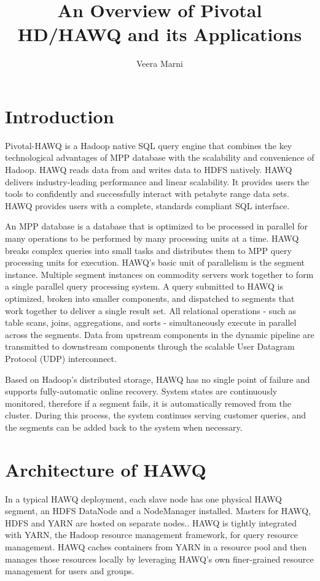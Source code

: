 \documentclass[9pt,twocolumn,twoside]{../../styles/osajnl}
\title{An Overview of Pivotal HD/HAWQ and its Applications}
\author[1]{Veera Marni}
\affil[1]{School of Informatics and Computing, Bloomington, IN 47408, 
U.S.A.}
\affil[*]{Corresponding authors: vmarni@umail.iu.edu}
\begin{document}
\maketitle

\section{Introduction} 

{Pivotal-HAWQ}\cite{www-about-hawq} is a Hadoop native SQL query 
engine that 
combines the key technological advantages of MPP database with the 
scalability and convenience of Hadoop. HAWQ reads data from and 
writes data to HDFS natively. HAWQ delivers industry-leading 
performance and linear scalability. It provides users the tools to 
confidently and successfully interact with petabyte range data sets. 
HAWQ provides users with a complete, standards compliant SQL 
interface.

{An MPP database is a database that is optimized to be processed in 
parallel for many operations to	be performed by many processing units 
at a time.}\cite{www-about-mpp} HAWQ breaks complex queries into 
small tasks and distributes them to MPP query processing units for 
execution. HAWQ’s basic unit of parallelism is the segment instance. 
Multiple segment instances on commodity servers work together to form 
a single parallel query processing system. A query submitted to HAWQ 
is optimized, broken into smaller components, and dispatched to 
segments that work together to deliver a single result set. All 
relational operations - such as table scans, joins, aggregations, and 
sorts - simultaneously execute in parallel across the segments. Data 
from upstream components in the dynamic pipeline are transmitted to 
downstream components through the scalable User Datagram Protocol 
{(UDP)}\cite{www-udp} interconnect.

Based on Hadoop’s distributed storage, HAWQ has no single point of 
failure and supports fully-automatic online recovery. System states 
are continuously monitored, therefore if a segment fails, it is 
automatically removed from the cluster. During this process, the 
system continues serving customer queries, and the segments can be 
added back to the system when necessary.

\section{Architecture of HAWQ}

In a typical HAWQ deployment, each slave node has one physical HAWQ 
segment, an HDFS DataNode and a {NodeManager}\cite{www-node-manager} 
installed. {Masters for 
HAWQ, HDFS and YARN are hosted on separate 
nodes.}\cite{www-hawq-architecture}. HAWQ is tightly integrated with 
YARN, the Hadoop resource management 
framework, for query resource management. HAWQ caches containers from 
YARN in a resource pool and then manages those resources locally by 
leveraging HAWQ’s own finer-grained resource management for users and 
groups.
\end{document}
